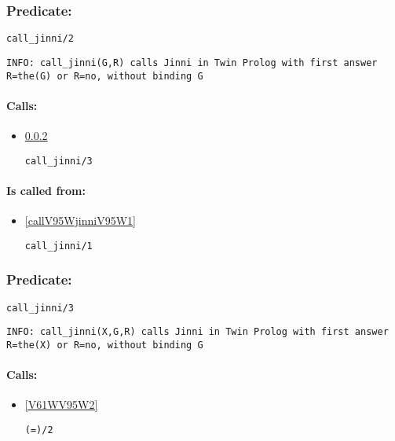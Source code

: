 \subsubsection{Predicate:} \label{callV95WjinniV95W2}

\begin{verbatim}
call_jinni/2
\end{verbatim}

{\small \begin{verbatim}
INFO: call_jinni(G,R) calls Jinni in Twin Prolog with first answer R=the(G) or R=no, without binding G

\end{verbatim}}
\paragraph{Calls:} 
\begin{itemize}
\item \ref{callV95WjinniV95W3} 
\begin{verbatim}
call_jinni/3
\end{verbatim}

\end{itemize}
\paragraph{Is called from:} 
\begin{itemize}
\item \ref{callV95WjinniV95W1} 
\begin{verbatim}
call_jinni/1
\end{verbatim}

\end{itemize}

\subsubsection{Predicate:} \label{callV95WjinniV95W3}

\begin{verbatim}
call_jinni/3
\end{verbatim}

{\small \begin{verbatim}
INFO: call_jinni(X,G,R) calls Jinni in Twin Prolog with first answer R=the(X) or R=no, without binding G

\end{verbatim}}
\paragraph{Calls:} 
\begin{itemize}
\item \ref{V61WV95W2} 
\begin{verbatim}
(=)/2
\end{verbatim}

\end{itemize}
